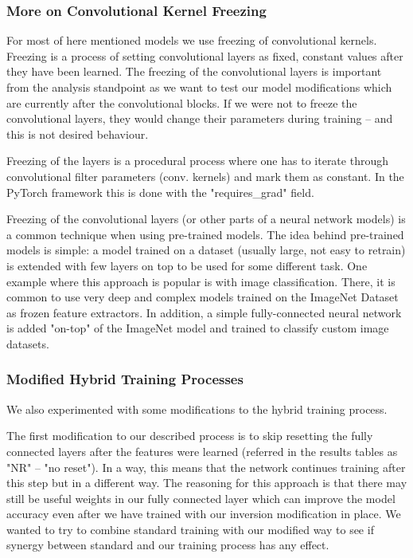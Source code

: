 \documentclass[b5paper]{book}
\begin{document}
\subsubsection{More on Convolutional Kernel Freezing}

For most of here mentioned models we use freezing of convolutional kernels. Freezing is a process of setting convolutional layers as fixed, constant values after they have been learned. The freezing of the convolutional layers is important from the analysis standpoint as we want to test our model modifications which are currently after the convolutional blocks. If we were not to freeze the convolutional layers, they would change their parameters during training -- and this is not desired behaviour. 

Freezing of the layers is a procedural process where one has to iterate through convolutional filter parameters (conv. kernels) and mark them as constant. In the PyTorch framework this is done with the "requires\_grad" field.

Freezing of the convolutional layers (or other parts of a neural network models) is a common technique when using pre-trained models. The idea behind pre-trained models is simple: a model trained on a dataset (usually large, not easy to retrain) is extended with few layers on top to be used for some different task. One example where this approach is popular is with image classification. There, it is common to use very deep and complex models trained on the ImageNet Dataset as frozen feature extractors. In addition, a simple fully-connected neural network is added "on-top" of the ImageNet model and trained to classify custom image datasets.

\subsubsection{Modified Hybrid Training Processes}
\label{altmodel}

We also experimented with some modifications to the hybrid training process.

The first modification to our described process is to skip resetting the fully connected layers after the features were learned (referred in the results tables as "NR" -- "no reset").  In a way, this means that the network continues training after this step but in a different way. The reasoning for this approach is that there may still be useful weights in our fully connected layer which can improve the model accuracy even after we have trained with our inversion modification in place. We wanted to try to combine standard training with our modified way to see if synergy between standard and our training process has any effect.
\end{document}
